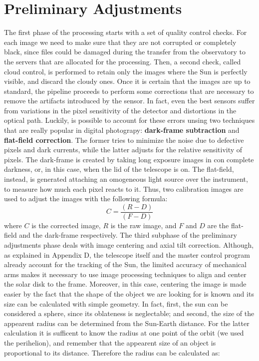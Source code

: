 \section{Preliminary Adjustments}
The first phase of the processing starts with a set of quality control checks. For each image we need to make sure that they are not corrupted or completely black, since files could be damaged during the transfer from the observatory to the servers that are allocated for the processing. Then, a second check, called cloud control, is performed to retain only the images where the Sun is perfectly visible, and discard the cloudy ones.
\bigbreak
Once it is certain that the images are up to standard, the pipeline proceeds to perform some corrections that are necessary to remove the artifacts introduced by the sensor. In fact, even the best sensors suffer from variations in the pixel sensitivity of the detector and distortions in the optical path. Luckily, is possible to account for these errors unsing two techniques that are really popular in digital photograpy: \textbf{dark-frame subtraction} and \textbf{flat-field correction}. The former tries to minimize the noise due to defective pixels and dark currents, while the latter adjusts for the relative sensitivity of pixels. The dark-frame is created by taking long exposure images in con complete darkness, or, in this case, when the lid of the telescope is on. The flat-field, instead, is generated attaching an omogeneous light source over the instrument, to measure how much each pixel reacts to it. Thus, two calibration images are used to adjust the images with the following formula:
\begin{equation}
C = \frac{(R - D)}{(F - D)}
\end{equation}
where $C$ is the corrected image, $R$ is the raw image, and $F$ and $D$ are the flat-field and the dark-frame respectively.
\bigbreak
The third subphase of the preliminary adjustments phase deals with image centering and axial tilt correction. Although, as explained in Appendix D, the telescope itself and the master control program already account for the tracking of the Sun, the limited accuracy of mechanical arms makes it necessary to use image processing techniques to align and center the solar disk to the frame. Moreover, in this case, centering the image is made easier by the fact that the shape of the object we are looking for is known and its size can be calculated with simple geometry. In fact, first, the sun can be considered a sphere, since its oblateness is neglectable; and second, the size of the appearent radius can be determined from the Sun-Earth distance. For the latter calculation it is sufficent to know the radius at one point of the orbit (we used the perihelion), and remember that the appearent size of an object is proportional to its distance. Therefore the radius can be calculated as:
